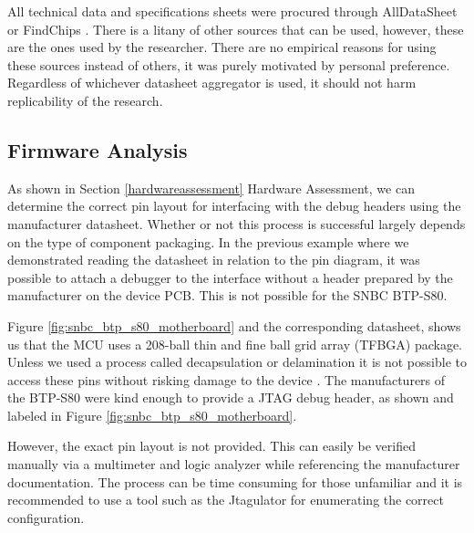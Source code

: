 All technical data and specifications sheets were procured through AllDataSheet or FindChips \autocite{ALLDATASHEETCOMElectronic,FindchipsElectronicPart}. There is a litany of other sources that can be used, however, these are the ones used by the researcher. There are no empirical reasons for using these sources instead of others, it was purely motivated by personal preference. Regardless of whichever datasheet aggregator is used, it should not harm replicability of the research.

\subsection{Firmware Analysis} \label{firmwareanalysis}



As shown in Section \ref{hardwareassessment} Hardware Assessment, we can determine the correct pin layout for interfacing with the debug headers using the manufacturer datasheet. Whether or not this process is successful largely depends on the type of component packaging. In the previous example where we demonstrated reading the datasheet in relation to the pin diagram, it was possible to attach a debugger to the interface without a header prepared by the manufacturer on the device PCB. This is not possible for the SNBC BTP-S80.

Figure \ref{fig:snbc_btp_s80_motherboard} and the corresponding datasheet, shows us that the MCU uses a 208-ball thin and fine ball grid array (TFBGA) package. Unless we used a process called decapsulation or delamination it is not possible to access these pins without risking damage to the device \autocite{sanchezlopezContributionStudyElectronic2015}. The manufacturers of the BTP-S80 were kind enough to provide a JTAG debug header, as shown and labeled in Figure \ref{fig:snbc_btp_s80_motherboard}.

However, the exact pin layout is not provided. This can easily be verified manually via a multimeter and logic analyzer while referencing the manufacturer documentation. The process can be time consuming for those unfamiliar and it is recommended to use a tool such as the Jtagulator \autocite{JTAGulator2023} for enumerating the correct configuration.

